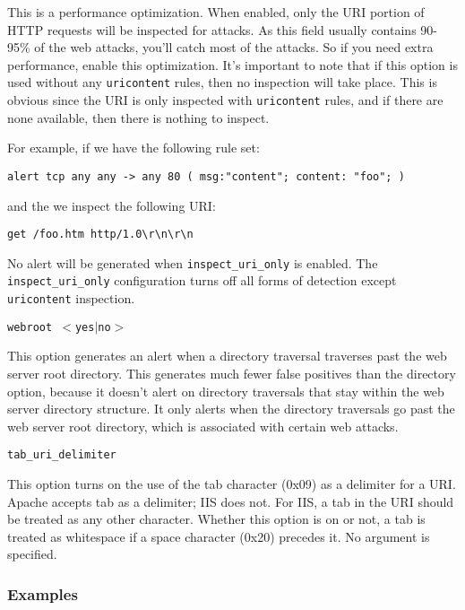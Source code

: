 \documentclass[english]{report}
\newcounter{slistnum}
\newenvironment{slist}
{ \begin{list}{ {\bf \arabic{slistnum}.} }{\usecounter{slistnum} } }
{ \end{list} }
\begin{document}
\begin{slist}
This is a performance optimization.  When enabled, only the URI portion of HTTP
requests will be inspected for attacks.  As this field usually contains 90-95\%
of the web attacks, you'll catch most of the attacks.  So if you need extra
performance, enable this optimization.  It's important to note that if
this option is used without any \texttt{uricontent} rules, then no inspection will take
place.  This is obvious since the URI is only inspected with \texttt{uricontent} rules,
and if there are none available, then there is nothing to inspect.

For example, if we have the following rule set:

\begin{verbatim}
alert tcp any any -> any 80 ( msg:"content"; content: "foo"; )
\end{verbatim}

and the we inspect the following URI:
\begin{verbatim}
get /foo.htm http/1.0\r\n\r\n
\end{verbatim}

No alert will be generated when \texttt{inspect\_uri\_only} is enabled.  The
\texttt{inspect\_uri\_only} configuration turns off all forms of detection except
\texttt{uricontent} inspection.

\item \texttt{webroot $<$yes$|$no$>$}

This option generates an alert when a directory traversal traverses past
the web server root directory.  This generates much fewer false positives than
the directory option, because it doesn't alert on directory traversals that
stay within the web server directory structure.  It only alerts when the
directory traversals go past the web server root directory, which
is associated with certain web attacks.

\item \texttt{tab\_uri\_delimiter}

This option turns on the use of the tab character (0x09) as a delimiter for
a URI.  Apache accepts tab as a delimiter; IIS does not.  For IIS, a tab in
the URI should be treated as any other character.  Whether this option is on
or not, a tab is treated as whitespace if a space character (0x20) precedes it.
No argument is specified.

\end{slist}

\subsubsection{Examples}
\end{document}

